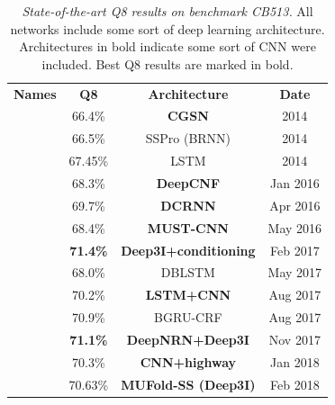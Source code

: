 \begin{table}
	\begin{tabular}{cccc}
		\textbf{Names} & \textbf{Q8} & \textbf{Architecture} & \textbf{Date} \\
		\cite{Zhou2014}    & 66.4\%     & \textbf{CGSN}             & 2014 \\ 
		\cite{Magnan2014} & 66.5\% & SSPro (BRNN) & 2014 \\
		\cite{Sønderby2014}    & 67.45\%     & LSTM             & 2014     \\ 
		\cite{Wang2016} & 68.3\% & \textbf{DeepCNF}     & Jan 2016 \\ 
		\cite{Li2016}    & 69.7\%     & \textbf{DCRNN}         & Apr 2016 \\
		\cite{Lin2016}     & 68.4\%     & \textbf{MUST-CNN}         & May 2016 \\
		\cite{Busia2017}& \textbf{71.4\%}& \textbf{Deep3I+conditioning}& Feb 2017 \\
		\cite{Hattori2017} & 68.0\%    & DBLSTM        & May 2017 \\
		\cite{Jurtz2017} & 70.2\%    & \textbf{LSTM+CNN}         & Aug 2017 \\
		\cite{Johansen2017} & 70.9\% & BGRU-CRF & Aug 2017 \\
		\cite{8371925} & \textbf{71.1\%} & \textbf{DeepNRN+Deep3I} & Nov 2017 \\
		\cite{Zhou2018} & 70.3\% & \textbf{CNN+highway} & Jan 2018 \\
		\cite{Fang2017}& 70.63\% & \textbf{MUFold-SS (Deep3I)}&Feb 2018\\
	\end{tabular}
	\label{tab:HoF}
	\caption{\textit{State-of-the-art Q8 results on benchmark CB513.} All networks include some sort of deep learning architecture. Architectures in bold indicate some sort of CNN were included. Best Q8 results are marked in bold.}
\end{table}